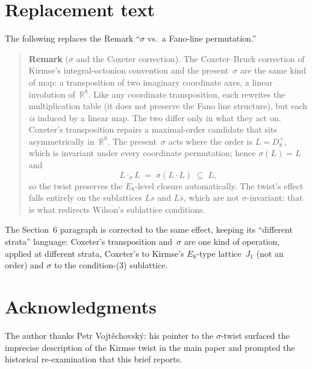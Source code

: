 \documentclass[11pt]{amsart}
\newcommand{\RR}{\mathbb{R}}
\begin{document}
\section{Replacement text}\label{sec:replacement}

The following replaces the Remark ``$\sigma$ vs.\ a Fano-line permutation.''

\begin{quote}
\textbf{Remark} ($\sigma$ and the Coxeter correction).
The Coxeter--Bruck correction of Kirmse's integral-octonion convention and
the present~$\sigma$ are the same kind of map: a transposition of two
imaginary coordinate axes, a linear involution of~$\RR^8$.  Like any
coordinate transposition, each rewrites the multiplication table (it does
not preserve the Fano line structure), but each \emph{is} induced by a
linear map.  The two differ only in what they act on.  Coxeter's
transposition repairs a maximal-order candidate that sits asymmetrically
in~$\RR^8$.  The present~$\sigma$ acts where the order is $L = D_8^+$, which
is invariant under every coordinate permutation; hence $\sigma(L) = L$ and
\[
  L \cdot_\sigma L \;=\; \sigma(L \cdot L) \;\subseteq\; L,
\]
so the twist preserves the $E_8$-level closure automatically.  The twist's
effect falls entirely on the sublattices $Ls$ and $L\bar s$, which are not
$\sigma$-invariant: that is what redirects Wilson's sublattice conditions.
\end{quote}

\noindent
The Section~6 paragraph is corrected to the same effect, keeping its
``different strata'' language: Coxeter's transposition and~$\sigma$ are one
kind of operation, applied at different strata, Coxeter's to Kirmse's
$E_8$-type lattice~$J_1$ (not an order) and $\sigma$ to the condition-(3)
sublattice.

\section*{Acknowledgments}

The author thanks Petr Vojt\v{e}chovsk\'{y}: his pointer to the
$\sigma$-twist surfaced the imprecise description of the Kirmse twist
in the main paper and prompted the historical re-examination that this
brief reports.
\end{document}
